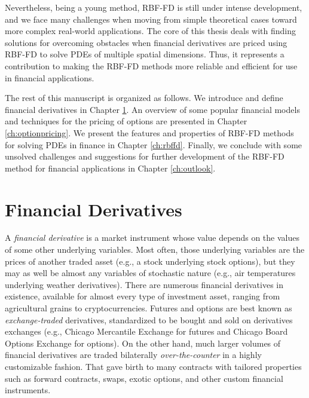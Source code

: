 \documentclass{UUThesisTemplate}
\begin{document}
\par
Nevertheless, being a young method, RBF-FD is still under intense development, and we face many challenges when moving from simple theoretical cases toward more complex real-world applications. The core of this thesis deals with finding solutions for overcoming obstacles when financial derivatives are priced using RBF-FD to solve PDEs of multiple spatial dimensions. Thus, it represents a contribution to making the RBF-FD methods more reliable and efficient for use in financial applications. 

\par
The rest of this manuscript is organized as follows. We introduce and define financial derivatives in Chapter \ref{ch:finder}. An overview of some popular financial models and techniques for the pricing of options are presented in Chapter \ref{ch:optionpricing}. We present the features and properties of RBF-FD methods for solving PDEs in finance in Chapter \ref{ch:rbffd}. Finally, we conclude with some unsolved challenges and suggestions for further development of the RBF-FD method for financial applications in Chapter \ref{ch:outlook}.
%
%





%
\chapter{Financial Derivatives}
\label{ch:finder}

\par
A \emph{financial derivative} is a market instrument whose value depends on the values of some other underlying variables. Most often, those underlying variables are the prices of another traded asset (e.g., a stock underlying stock options), but they may as well be almost any variables of stochastic nature (e.g., air temperatures underlying weather derivatives). There are numerous financial derivatives in existence, available for almost every type of investment asset, ranging from agricultural grains to cryptocurrencies. Futures and options are best known as \emph{exchange-traded} derivatives, standardized to be bought and sold on derivatives exchanges (e.g., Chicago Mercantile Exchange for futures and Chicago Board Options Exchange for options). On the other hand, much larger volumes of financial derivatives are traded bilaterally \emph{over-the-counter} in a highly customizable fashion. That gave birth to many contracts with tailored properties such as forward contracts, swaps, exotic options, and other custom financial instruments.
\end{document}
